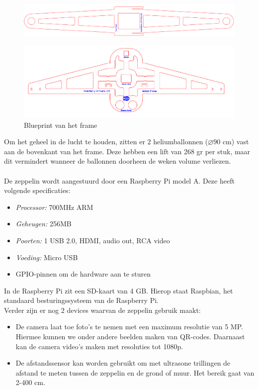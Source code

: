 \documentclass[eind]{penoverslag}
\begin{document}
\begin{figure}[ht!]
\centering
\includegraphics[scale=0.3]{upperFrame.png}
\label{frame}
\end{figure}

\begin{figure}[ht!]
\centering
\includegraphics[scale=0.3]{lowerFrame.png}
\caption{Blueprint van het frame}
\label{frame}
\end{figure}

Om het geheel in de lucht te houden, zitten er 2 heliumballonnen ($\diameter$90 cm) vast aan de bovenkant van het frame. Deze hebben een lift van 268 gr per stuk, maar dit vermindert wanneer de ballonnen doorheen de weken volume verliezen. \\
\\
De zeppelin wordt aangestuurd door een Raspberry Pi model A. Deze heeft volgende specificaties: 
\begin{itemize}
	\item \emph{Processor:} 700MHz ARM
	\item \emph{Geheugen:} 256MB 
	\item \emph{Poorten:} 1 USB 2.0, HDMI, audio out, RCA video
	\item \emph{Voeding:} Micro USB
	\item GPIO-pinnen om de hardware aan te sturen
\end{itemize}

In de Raspberry Pi zit een SD-kaart van 4 GB. Hierop staat Raspbian, het standaard besturingssysteem van de Raspberry Pi. \\

Verder zijn er nog 2 devices waarvan de zeppelin gebruik maakt:
\begin{itemize}
	\item De camera laat toe foto's te nemen met een maximum resolutie van 5 MP. Hiermee kunnen we onder andere beelden maken van QR-codes. Daarnaast kan de camera video's maken met resoluties tot 1080p. 
	\item De afstandssensor kan worden gebruikt om met ultrasone trillingen de afstand te meten tussen de zeppelin en de grond of muur. Het bereik gaat van 2-400 cm. \\
\end{itemize}
\end{document}
